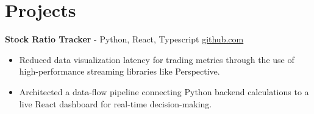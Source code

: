 \documentclass[11pt]{article}       %
\begin{document}

\vspace{-18.5pt}

\section*{Projects}

\textbf{Stock Ratio Tracker}{ - Python, React, Typescript} \hfill \href{https://github.com/Monica20030707/tradingDashboard-UI}{github.com} \\
\vspace{-9pt}
\begin{itemize}
  \item Reduced data visualization latency for trading metrics through the use of high-performance streaming libraries like Perspective.
  \item Architected a data-flow pipeline connecting Python backend calculations to a live React dashboard for real-time decision-making.
\end{itemize}

\end{document}
